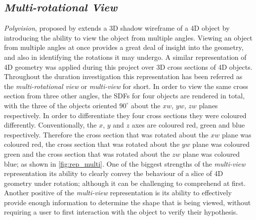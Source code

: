 \documentclass{l4proj}
\begin{document}
\subsection{\textit{Multi-rotational View}}
\textit{Polyvision}, proposed by \citet{matsumoto_polyvision_2019} extends a 3D shadow wireframe of a 4D object by introducing the ability to view the object from multiple angles. Viewing an object from multiple angles at once provides a great deal of insight into the geometry, and also in identifying the rotations it may undergo.
A similar representation of 4D geometry was applied during this project over 3D cross sections of 4D objects. Throughout the duration investigation this representation has been referred as the \textit{multi-rotational view} or \textit{multi-view} for short.
In order to view the same cross section from three other angles, the SDFs for four objects are rendered in total, with the three of the objects oriented $90^{\circ}$ about the $xw$, $yw$, $zw$ planes respectively. 
In order to differentiate they four cross sections they were coloured differently. Conventionally, the \(x\), \(y\) and \(z\) axes are coloured red, green and blue respectively. Therefore the cross section that was rotated about the $xw$ plane was coloured red, the cross section that was rotated about the $yw$ plane was coloured green and the cross section that was rotated about the $zw$ plane was coloured blue; as shown in \cref{fig:rep_multi}.
One of the biggest strengths of the \textit{multi-view} representation its ability to clearly convey the behaviour of a slice of 4D geometry under rotation; although it can be challenging to comprehend at first.
Another positive of the \textit{multi-view} representation is its ability to effectively provide enough information to determine the shape that is being viewed, without requiring a user to first interaction with the object to verify their hypothesis.
\end{document}
